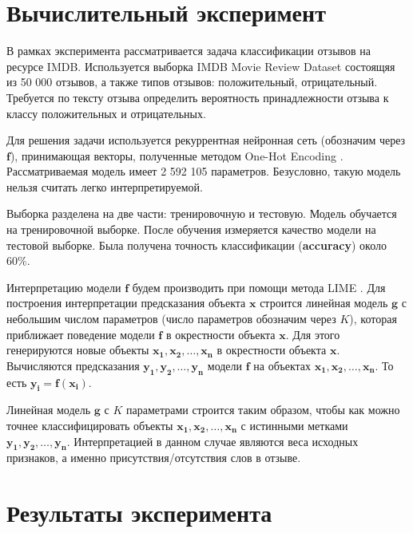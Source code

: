 \documentclass[a4paper, 12pt]{article}
\begin{document}

\section{Вычислительный эксперимент}

В рамках эксперимента рассматривается задача классификации отзывов на ресурсе IMDB. Используется выборка IMDB Movie Review Dataset \cite{maas-EtAl:2011:ACL-HLT2011} состоящяя из 50 000 отзывов, а также типов отзывов: положительный, отрицательный. Требуется по тексту отзыва определить вероятность принадлежности отзыва к классу положительных и отрицательных.

Для решения задачи используется рекуррентная нейронная сеть (обозначим через $\mathbf{f}$), принимающая векторы, полученные методом One-Hot Encoding \cite{onehot2018}. Рассматриваемая модель имеет 2 592 105 параметров. Безусловно, такую модель нельзя считать легко интерпретируемой.

Выборка разделена на две части: тренировочную и тестовую. Модель обучается на тренировочной выборке. После обучения измеряется качество модели на тестовой выборке. Была получена точность классификации (\textbf{accuracy}) около 60\%.

Интерпретацию модели $\mathbf{f}$ будем производить при помощи метода LIME \cite{ribeiro2016why}. Для построения интерпретации предсказания объекта $\mathbf{x}$ строится линейная модель $\mathbf{g}$ с небольшим числом параметров (число параметров обозначим через $K$), которая приближает поведение модели $\mathbf{f}$ в окрестности объекта $\mathbf{x}$. Для этого генерируются новые объекты $\mathbf{x_1}, \mathbf{x_2}, \dots, \mathbf{x_n}$ в окрестности объекта $\mathbf{x}$. Вычисляются предсказания $\mathbf{y_1}, \mathbf{y_2}, \dots, \mathbf{y_n}$ модели $\mathbf{f}$ на объектах $\mathbf{x_1}, \mathbf{x_2}, \dots, \mathbf{x_n}$. То есть $\mathbf{y_i}=\mathbf{f}(\mathbf{x_i})$.

Линейная модель $\mathbf{g}$ с $K$ параметрами строится таким образом, чтобы как можно точнее классифицировать объекты $\mathbf{x_1}, \mathbf{x_2}, \dots, \mathbf{x_n}$ с истинными метками $\mathbf{y_1}, \mathbf{y_2}, \dots, \mathbf{y_n}$. Интерпретацией в данном случае являются веса исходных признаков, а именно присутствия/отсутствия слов в отзыве.

\section{Результаты эксперимента}
\end{document}
